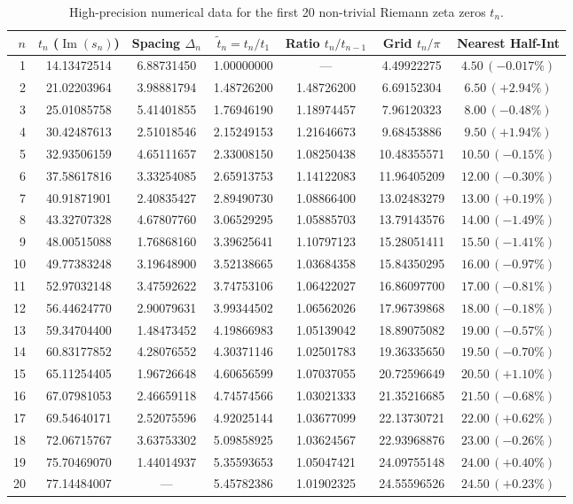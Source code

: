 \documentclass[11pt,a4paper]{article}
\begin{document}
\begin{table}[h!]
\centering
\small
\caption{High-precision numerical data for the first 20 non-trivial Riemann zeta zeros $t_n$.}
\label{tab:zeta_zeros}
\begin{tabular}{rcccccc}
\toprule
$n$ & $t_n$ ($\operatorname{Im}(s_n)$) & Spacing $\Delta_n$ & $\tilde{t}_n = t_n / t_1$ & Ratio $t_n / t_{n-1}$ & Grid $t_n / \pi$ & Nearest Half-Int \\
\midrule
1  & 14.13472514 & 6.88731450 & 1.00000000 & ---        & 4.49922275 & $4.50 \, (-0.017\%)$ \\
2  & 21.02203964 & 3.98881794 & 1.48726200 & 1.48726200 & 6.69152304 & $6.50 \, (+2.94\%)$  \\
3  & 25.01085758 & 5.41401855 & 1.76946190 & 1.18974457 & 7.96120323 & $8.00 \, (-0.48\%)$  \\
4  & 30.42487613 & 2.51018546 & 2.15249153 & 1.21646673 & 9.68453886 & $9.50 \, (+1.94\%)$  \\
5  & 32.93506159 & 4.65111657 & 2.33008150 & 1.08250438 & 10.48355571 & $10.50 \, (-0.15\%)$ \\
6  & 37.58617816 & 3.33254085 & 2.65913753 & 1.14122083 & 11.96405209 & $12.00 \, (-0.30\%)$ \\
7  & 40.91871901 & 2.40835427 & 2.89490730 & 1.08866400 & 13.02483279 & $13.00 \, (+0.19\%)$ \\
8  & 43.32707328 & 4.67807760 & 3.06529295 & 1.05885703 & 13.79143576 & $14.00 \, (-1.49\%)$ \\
9  & 48.00515088 & 1.76868160 & 3.39625641 & 1.10797123 & 15.28051411 & $15.50 \, (-1.41\%)$ \\
10 & 49.77383248 & 3.19648900 & 3.52138665 & 1.03684358 & 15.84350295 & $16.00 \, (-0.97\%)$ \\
11 & 52.97032148 & 3.47592622 & 3.74753106 & 1.06422027 & 16.86097700 & $17.00 \, (-0.81\%)$ \\
12 & 56.44624770 & 2.90079631 & 3.99344502 & 1.06562026 & 17.96739868 & $18.00 \, (-0.18\%)$ \\
13 & 59.34704400 & 1.48473452 & 4.19866983 & 1.05139042 & 18.89075082 & $19.00 \, (-0.57\%)$ \\
14 & 60.83177852 & 4.28076552 & 4.30371146 & 1.02501783 & 19.36335650 & $19.50 \, (-0.70\%)$ \\
15 & 65.11254405 & 1.96726648 & 4.60656599 & 1.07037055 & 20.72596649 & $20.50 \, (+1.10\%)$ \\
16 & 67.07981053 & 2.46659118 & 4.74574566 & 1.03021333 & 21.35216685 & $21.50 \, (-0.68\%)$ \\
17 & 69.54640171 & 2.52075596 & 4.92025144 & 1.03677099 & 22.13730721 & $22.00 \, (+0.62\%)$ \\
18 & 72.06715767 & 3.63753302 & 5.09858925 & 1.03624567 & 22.93968876 & $23.00 \, (-0.26\%)$ \\
19 & 75.70469070 & 1.44014937 & 5.35593653 & 1.05047421 & 24.09755148 & $24.00 \, (+0.40\%)$ \\
20 & 77.14484007 & ---        & 5.45782386 & 1.01902325 & 24.55596526 & $24.50 \, (+0.23\%)$ \\
\bottomrule
\end{tabular}
\end{table}
\end{document}
